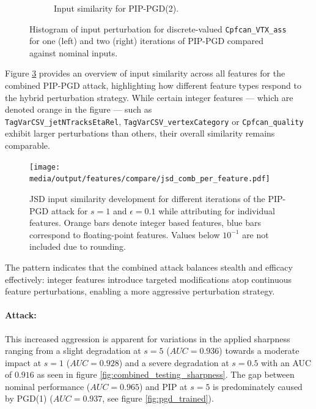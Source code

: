 \begin{figure}[htbp]
\begin{subfigure}[t]{0.5\textwidth}
    \caption{Input similarity for PIP-PGD(2).}
    \label{fig:middle}
  \end{subfigure}\hfill

  \caption{Histogram of input perturbation for discrete-valued \texttt{Cpfcan\_VTX\_ass} for one (left) and two (right) iterations of PIP-PGD compared against nominal inputs.}
  \label{fig:combined_input_vtxAss}
\end{figure}

Figure \ref{fig:combined_joint_overview} provides an overview of input similarity across all features for the combined PIP-PGD attack, highlighting how different feature types respond to the hybrid perturbation strategy. While certain integer features — which are denoted orange in the figure — such as \\ \texttt{TagVarCSV\_jetNTracksEtaRel}, \texttt{TagVarCSV\_vertexCategory} or \texttt{Cpfcan\_quality} exhibit larger perturbations than others, their overall similarity remains comparable.


\begin{figure}[H]
\centering
    \texttt{[image: media/output/features/compare/jsd\_comb\_per\_feature.pdf]}
    \caption{JSD input similarity development for different iterations of the PIP-PGD attack for $s=1$ and $\epsilon=0.1$ while attributing for individual features. Orange bars denote integer based features, blue bars correspond to floating-point features. Values below $10^{-1}$ are not included due to rounding.}
    \label{fig:combined_joint_overview}
\end{figure}

The pattern indicates that the combined attack balances stealth and efficacy effectively: integer features introduce targeted modifications atop continuous feature perturbations, enabling a more aggressive perturbation strategy. 

\paragraph{Attack:} This increased aggression is apparent for variations in the applied sharpness ranging from a slight degradation at $s=5$ ($AUC=0.936$) towards a moderate impact at $s=1$ ($AUC=0.928$) and a severe degradation at $s=0.5$ with an AUC of $0.916$  as seen in figure \ref{fig:combined_testing_sharpness}. The gap between nominal performance ($AUC=0.965$) and PIP at $s=5$ is predominately caused by PGD(1) ($AUC=0.937$, see figure \ref{fig:pgd_trained}).

